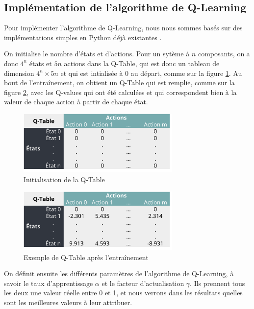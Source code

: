 \documentclass[a4paper]{article}
\begin{document}
    \subsection{Implémentation de l'algorithme de Q-Learning}

    Pour implémenter l'algorithme de Q-Learning, nous nous sommes basés sur des implémentations simples en Python déjà existantes \cite{noauthor_httpswwwgeeksforgeeksorgQ-Learning--python_2019}.

    On initialise le nombre d'états et d'actions. Pour un sytème à $n$ composants, on a donc $4^n$ états et $5n$ actions dans la Q-Table, qui est donc un tableau de dimension $4^n \times 5n$ et qui est intialisée à 0 au départ, comme sur la figure \ref{fig:qtableinit}.
    Au bout de l'entraînement, on obtient un Q-Table qui est remplie, comme sur la figure \ref{fig:qtablefin}, avec les Q-values qui ont été calculées et qui correspondent bien à la valeur de chaque action à partir de chaque état.

    \begin{figure}[b]
        \centering
        \includegraphics[width=8cm]{QtableInit.png}
        \caption{Initialisation de la Q-Table}
        \label{fig:qtableinit}
    \end{figure}

    \begin{figure}
        \centering
        \includegraphics[width=8cm]{QTable2.png}
        \caption{Exemple de Q-Table après l'entraînement}
        \label{fig:qtablefin}
    \end{figure}

    On définit ensuite les différents paramètres de l'algorithme de Q-Learning, à savoir le taux d'apprentissage $\alpha$ et le facteur d'actualisation $\gamma$. 
    Ils prennent tous les deux une valeur réelle entre 0 et 1, et nous verrons dans les résultats quelles sont les meilleures valeurs à leur attribuer.
\end{document}
